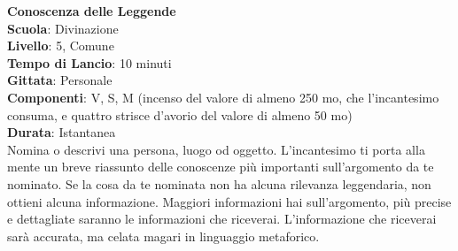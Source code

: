 \begin{multicols}{2}
\medskip\textbf{Conoscenza delle Leggende}\\
\textbf{Scuola}: Divinazione\\
\textbf{Livello}: 5, Comune\\
\textbf{Tempo di Lancio}: 10 minuti\\
\textbf{Gittata}: Personale\\
\textbf{Componenti}: V, S, M (incenso del valore di almeno 250 mo, che l'incantesimo consuma, e quattro strisce d'avorio del valore di almeno 50 mo)\\
\textbf{Durata}: Istantanea\\
Nomina o descrivi una persona, luogo od oggetto. L'incantesimo ti porta alla mente un breve riassunto delle conoscenze più importanti sull'argomento da te nominato. Se la cosa da te nominata non ha alcuna rilevanza leggendaria, non ottieni alcuna informazione. Maggiori informazioni hai sull'argomento, più precise e dettagliate saranno le informazioni che riceverai. L'informazione che riceverai sarà accurata, ma celata magari in linguaggio metaforico.


\end{multicols}
